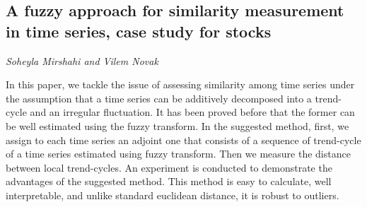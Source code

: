 \documentclass[../booklet.tex]{subfiles}
\begin{document}
\subsection[A fuzzy approach for similarity measurement in time series, case study for stocks. {\it Soheyla Mirshahi and Vilem Novak}]{A fuzzy approach for similarity measurement in time series, case study for stocks}
 

\begin{center}
  {\it Soheyla Mirshahi and Vilem Novak}
\end{center}

\vskip 0.8cm


 
In this paper, we tackle the issue of assessing similarity among time series under the assumption that a time series can be additively decomposed into a trend-cycle and an irregular fluctuation.  It has been proved before that the former can be well estimated using the fuzzy transform. In the suggested method, first, we assign to each time series an adjoint one that consists of a sequence of trend-cycle of a time series estimated using fuzzy transform. Then we measure the distance between local trend-cycles. An experiment is conducted to demonstrate the advantages of the suggested method. This method is easy to calculate, well interpretable, and unlike standard euclidean distance, it is robust to outliers. 
\end{document}
